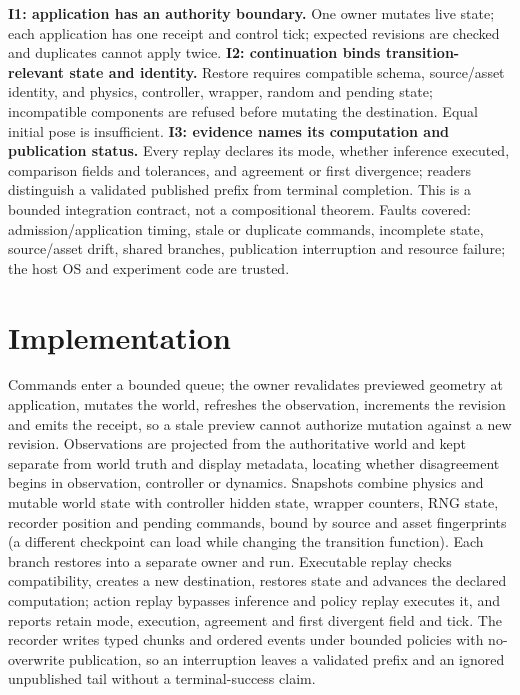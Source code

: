 \documentclass[letterpaper]{article}
\begin{document}
\textbf{I1: application has an authority boundary.} One owner mutates live state; each application has one
receipt and control tick; expected revisions are checked and duplicates cannot apply twice.
\textbf{I2: continuation binds transition-relevant state and identity.} Restore requires compatible schema,
source/asset identity, and physics, controller, wrapper, random and pending state; incompatible components are
refused before mutating the destination. Equal initial pose is insufficient.
\textbf{I3: evidence names its computation and publication status.} Every replay declares its mode, whether
inference executed, comparison fields and tolerances, and agreement or first divergence; readers distinguish a
validated published prefix from terminal completion. This is a bounded integration contract, not a compositional
theorem. Faults covered: admission/application timing, stale or duplicate commands, incomplete state,
source/asset drift, shared branches, publication interruption and resource failure; the host OS and experiment
code are trusted.

\section{Implementation}
Commands enter a bounded queue; the owner revalidates previewed geometry at application, mutates the world,
refreshes the observation, increments the revision and emits the receipt, so a stale preview cannot authorize
mutation against a new revision. Observations are projected from the authoritative world and kept separate from
world truth and display metadata, locating whether disagreement begins in observation, controller or dynamics.
Snapshots combine physics and mutable world state with controller hidden state, wrapper counters, RNG state, recorder
position and pending commands, bound by source and asset fingerprints (a different checkpoint can load while changing
the transition function). Each branch restores into a separate owner and run. Executable replay checks compatibility,
creates a new destination, restores state and advances the declared computation; action replay bypasses inference and
policy replay executes it, and reports retain mode, execution, agreement and first divergent field and tick.
The recorder writes typed chunks and ordered events under bounded policies with no-overwrite publication, so an
interruption leaves a validated prefix and an ignored unpublished tail without a terminal-success claim.
\end{document}
